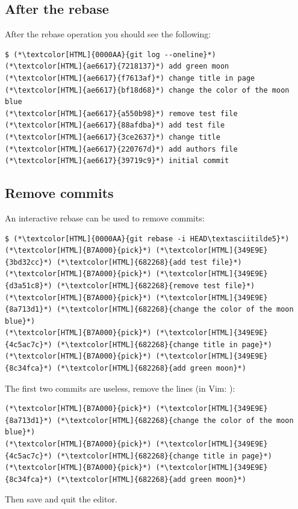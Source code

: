 \subsection{After the rebase}
\begin{frame}[fragile]
  \subslidetitle

   After the rebase operation you should see the following:
  \begin{lstlisting}
$ (*\textcolor[HTML]{0000AA}{git log --oneline}*)
(*\textcolor[HTML]{ae6617}{7218137}*) add green moon
(*\textcolor[HTML]{ae6617}{f7613af}*) change title in page
(*\textcolor[HTML]{ae6617}{bf18d68}*) change the color of the moon blue
(*\textcolor[HTML]{ae6617}{a550b98}*) remove test file
(*\textcolor[HTML]{ae6617}{88afdba}*) add test file
(*\textcolor[HTML]{ae6617}{3ce2637}*) change title
(*\textcolor[HTML]{ae6617}{220767d}*) add authors file
(*\textcolor[HTML]{ae6617}{39719c9}*) initial commit
\end{lstlisting}
\end{frame}

\subsection{Remove commits}
\begin{frame}[fragile]
  \subslidetitle
  An interactive rebase can be used to remove commits:
  \begin{lstlisting}
$ (*\textcolor[HTML]{0000AA}{git rebase -i HEAD\textasciitilde5}*)
(*\textcolor[HTML]{B7A000}{pick}*) (*\textcolor[HTML]{349E9E}{3bd32cc}*) (*\textcolor[HTML]{682268}{add test file}*)
(*\textcolor[HTML]{B7A000}{pick}*) (*\textcolor[HTML]{349E9E}{d3a51c8}*) (*\textcolor[HTML]{682268}{remove test file}*)
(*\textcolor[HTML]{B7A000}{pick}*) (*\textcolor[HTML]{349E9E}{8a713d1}*) (*\textcolor[HTML]{682268}{change the color of the moon blue}*)
(*\textcolor[HTML]{B7A000}{pick}*) (*\textcolor[HTML]{349E9E}{4c5ac7c}*) (*\textcolor[HTML]{682268}{change title in page}*)
(*\textcolor[HTML]{B7A000}{pick}*) (*\textcolor[HTML]{349E9E}{8c34fca}*) (*\textcolor[HTML]{682268}{add green moon}*)
\end{lstlisting}
  The first two commits are useless, remove the lines (in Vim: ):
  \begin{lstlisting}
(*\textcolor[HTML]{B7A000}{pick}*) (*\textcolor[HTML]{349E9E}{8a713d1}*) (*\textcolor[HTML]{682268}{change the color of the moon blue}*)
(*\textcolor[HTML]{B7A000}{pick}*) (*\textcolor[HTML]{349E9E}{4c5ac7c}*) (*\textcolor[HTML]{682268}{change title in page}*)
(*\textcolor[HTML]{B7A000}{pick}*) (*\textcolor[HTML]{349E9E}{8c34fca}*) (*\textcolor[HTML]{682268}{add green moon}*)
\end{lstlisting}


  Then save and quit the editor.

\end{frame}


